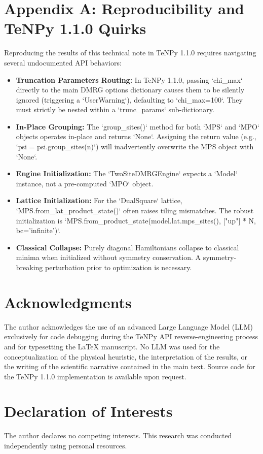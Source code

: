 \documentclass[aps,prb,reprint,superscriptaddress,amsmath,amssymb]{revtex4-2}
\begin{document}
\section*{Appendix A: Reproducibility and TeNPy 1.1.0 Quirks}
Reproducing the results of this technical note in TeNPy 1.1.0 requires navigating several undocumented API behaviors:
\begin{itemize}
    \item \textbf{Truncation Parameters Routing:} In TeNPy 1.1.0, passing `chi\_max` directly to the main DMRG options dictionary causes them to be silently ignored (triggering a `UserWarning`), defaulting to `chi\_max=100`. They must strictly be nested within a `trunc\_params` sub-dictionary.
    \item \textbf{In-Place Grouping:} The `group\_sites()` method for both `MPS` and `MPO` objects operates in-place and returns `None`. Assigning the return value (e.g., `psi = psi.group\_sites(n)`) will inadvertently overwrite the MPS object with `None`.
    \item \textbf{Engine Initialization:} The `TwoSiteDMRGEngine` expects a `Model` instance, not a pre-computed `MPO` object.
    \item \textbf{Lattice Initialization:} For the `DualSquare` lattice, `MPS.from\_lat\_product\_state()` often raises tiling mismatches. The robust initialization is `MPS.from\_product\_state(model.lat.mps\_sites(), ["up"] * N, bc='infinite')`.
    \item \textbf{Classical Collapse:} Purely diagonal Hamiltonians collapse to classical minima when initialized without symmetry conservation. A symmetry-breaking perturbation prior to optimization is necessary.
\end{itemize}

\section*{Acknowledgments}
The author acknowledges the use of an advanced Large Language Model (LLM) exclusively for code debugging during the TeNPy API reverse-engineering process and for typesetting the \LaTeX{} manuscript. No LLM was used for the conceptualization of the physical heuristic, the interpretation of the results, or the writing of the scientific narrative contained in the main text. Source code for the TeNPy 1.1.0 implementation is available upon request.

\section*{Declaration of Interests}
The author declares no competing interests. This research was conducted independently using personal resources.
\end{document}

